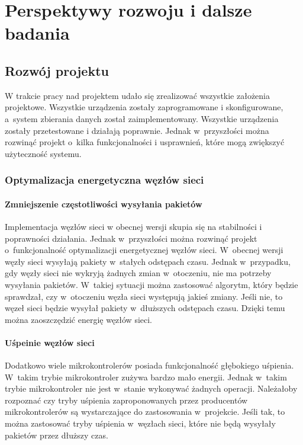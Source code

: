 \chapter{Perspektywy rozwoju i dalsze badania}

\section{Rozwój projektu}
W trakcie pracy nad projektem udało się zrealizować wszystkie założenia projektowe. Wszystkie urządzenia zostały zaprogramowane i skonfigurowane, a~system zbierania danych został zaimplementowany. Wszystkie urządzenia zostały przetestowane i działają poprawnie. Jednak w~przyszłości można rozwinąć projekt o~kilka funkcjonalności i usprawnień, które mogą zwiększyć użyteczność systemu.

\subsection{Optymalizacja energetyczna węzłów sieci}
\subsubsection*{Zmniejszenie częstotliwości wysyłania pakietów}
Implementacja węzłów sieci w obecnej wersji skupia się na stabilności i poprawności działania. Jednak w~przyszłości można rozwinąć projekt o~funkcjonalność optymalizacji energetycznej węzłów sieci. W~obecnej wersji węzły sieci wysyłają pakiety w~stałych odstępach czasu. Jednak w~przypadku, gdy węzły sieci nie wykryją żadnych zmian w~otoczeniu, nie ma potrzeby wysyłania pakietów. W~takiej sytuacji można zastosować algorytm, który będzie sprawdzał, czy w~otoczeniu węzła sieci występują jakieś zmiany. Jeśli nie, to węzeł sieci będzie wysyłał pakiety w~dłuższych odstępach czasu. Dzięki temu można zaoszczędzić energię węzłów sieci.

\subsubsection{Uśpeinie węzłów sieci}

Dodatkowo wiele mikrokontrolerów  posiada funkcjonalność głębokiego uśpienia. W~takim trybie mikrokontroler zużywa bardzo mało energii. Jednak w~takim trybie mikrokontroler nie jest w~stanie wykonywać żadnych operacji. Należałoby rozpoznać czy tryby uśpienia zaproponowanych przez producentów mikrokontrolerów są wystarczające do zastosowania w~projekcie. Jeśli tak, to można zastosować tryby uśpienia w~węzłach sieci, które nie będą wysyłały pakietów przez dłuższy czas.

